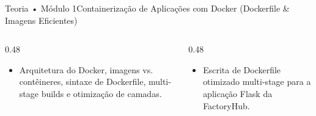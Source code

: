 \begin{senaiframe}{Teoria • Módulo 1}{Containerização de Aplicações com Docker (Dockerfile & Imagens Eficientes)}
  \begin{columns}[t]
    \begin{column}{0.48\textwidth}
      \begin{tcolorbox}[senaibluecard, title={Fundamentos Teóricos}]
        \begin{itemize}
          \item Arquitetura do Docker, imagens vs. contêineres, sintaxe de Dockerfile, multi-stage builds e otimização de camadas.
        \end{itemize}
      \end{tcolorbox}
    \end{column}
    \begin{column}{0.48\textwidth}
      \begin{tcolorbox}[senaigreencard, title={Prática \& Laboratório}]
        \begin{itemize}
          \item Escrita de Dockerfile otimizado multi-stage para a aplicação Flask da FactoryHub.
        \end{itemize}
      \end{tcolorbox}
    \end{column}
  \end{columns}
\end{senaiframe}
